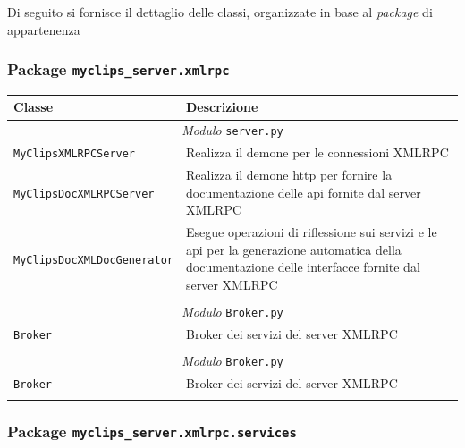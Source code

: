 Di seguito si fornisce il dettaglio delle classi, organizzate in base al \emph{package} di appartenenza

\subsubsection{Package \texttt{myclips\_server.xmlrpc}}

\begin{longtable}{p{5.5cm}p{6.5cm}}
\hline 
\textbf{Classe} & \textbf{Descrizione} \\ 
\hline\hline 
\endhead

\multicolumn{2}{c}{\emph{Modulo} \texttt{server.py}}\\
	\hdashline[5pt/5pt]
		\texttt{MyClipsXMLRPCServer} & Realizza il demone per le connessioni XMLRPC \\ 
	\hdashline[1pt/5pt]
		\texttt{MyClipsDocXMLRPCServer} & Realizza il demone http per fornire la documentazione delle api fornite dal server XMLRPC \\ 
	\hdashline[1pt/5pt]
		\texttt{MyClipsDocXMLDocGenerator} & Esegue operazioni di riflessione sui servizi e le api per la generazione automatica della documentazione delle interfacce fornite dal server XMLRPC \\ 
	\hline\\
	
\multicolumn{2}{c}{\emph{Modulo} \texttt{Broker.py}}\\
	\hdashline[5pt/5pt]
		\texttt{Broker} & Broker dei servizi del server XMLRPC \\ 
	\hline\\

\multicolumn{2}{c}{\emph{Modulo} \texttt{Broker.py}}\\
	\hdashline[5pt/5pt]
		\texttt{Broker} & Broker dei servizi del server XMLRPC \\ 
	\hline\\
	

\end{longtable}


\subsubsection{Package \texttt{myclips\_server.xmlrpc.services}}

